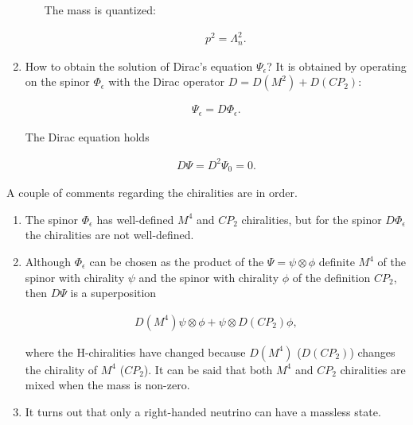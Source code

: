 \documentclass[10pt,epsf]{article}
\begin{document}
\begin{enumerate}
\begin{enumerate}
The mass is quantized:

\begin{eqnarray}
p^2= \Lambda_n^2 .
\end{eqnarray}


\end{enumerate}

\item How to obtain the solution of Dirac's equation $\Psi_{\epsilon}$? It is obtained by operating on the spinor $\Phi_{\epsilon}$ with the Dirac operator $D=D(M^2)+D(CP_2)$:

\begin{eqnarray}
\Psi_{\epsilon}= D\Phi_{\epsilon} .
\end{eqnarray}


The Dirac equation holds

\begin{eqnarray}
D\Psi= D^2\Psi_0 = 0 .
\end{eqnarray}


\end{enumerate}

 A couple of comments regarding the chiralities are in order.

\begin{enumerate}

\item The spinor $\Phi_{\epsilon}$ has well-defined $M^4$ and $CP_2$ chiralities, but for the spinor $D\Phi_{\epsilon}$ the chiralities are not well-defined.

\item Although $\Phi_{\epsilon}$ can be chosen as the product of the $\Psi=\psi\otimes \phi$ definite $M^4$ of the spinor with chirality $\psi$ and the spinor with chirality $\phi$ of the definition $CP_2$, then $D\Psi$ is a superposition

\begin{eqnarray}
D(M^4) \psi\otimes \phi + \psi\otimes D(CP_2)\phi ,
\end{eqnarray}

\noindent where the H-chiralities have changed because $D(M^4)$ ($D(CP_2)$) changes the chirality of $M^4$ ($CP_2$). It can be said that both $M^4$ and $CP_2$ chiralities are mixed when the mass is non-zero.

\item It turns out that only a right-handed neutrino can have a massless state.

\end{enumerate}
\end{document}
